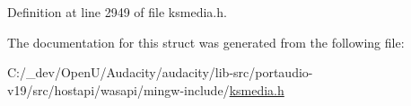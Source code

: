 Definition at line 2949 of file ksmedia.\+h.



The documentation for this struct was generated from the following file\+:\begin{DoxyCompactItemize}
\item 
C\+:/\+\_\+dev/\+Open\+U/\+Audacity/audacity/lib-\/src/portaudio-\/v19/src/hostapi/wasapi/mingw-\/include/\hyperlink{ksmedia_8h}{ksmedia.\+h}\end{DoxyCompactItemize}
